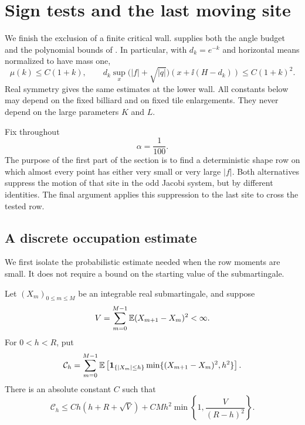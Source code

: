 \section{Sign tests and the last moving site}
\label{sign:section}

We finish the exclusion of a finite critical wall.
 supplies both the angle budget and
the polynomial bounds of .
In particular, with
\(d_k=e^{-k}\) and horizontal means normalized to have mass one,
\begin{equation}\label{sign:polynomial-input}
 \mu(k)\le C(1+k),\qquad
 d_k\sup_x\bigl(|f|+\sqrt{|q|}\bigr)
       (x+\ii(H-d_k))\le C(1+k)^2.
\end{equation}
Real symmetry gives the same estimates at the lower wall.  All constants
below may depend on the fixed billiard and on fixed tile enlargements.
They never depend on the large parameters \(K\) and \(L\).

Fix throughout
\begin{equation}\label{sign:alpha}
 \alpha=\frac1{100}.
\end{equation}
The purpose of the first part of the section is to find a deterministic
shape row on which almost every point has either very small or very large
\(|f|\).  Both alternatives suppress the motion of that site in the odd
Jacobi system, but by different identities.  The final argument applies
this suppression to the last site to cross the tested row.

\subsection{A discrete occupation estimate}

We first isolate the probabilistic estimate needed when the row moments
are small.  It does not require a bound on the starting value of the
submartingale.

\begin{lemma}\label{lem:discrete-tanaka}
Let \((X_m)_{0\le m\le M}\) be an integrable real submartingale, and suppose
\[
 V=\sum_{m=0}^{M-1}\mathbb E(X_{m+1}-X_m)^2<\infty.
\]
For \(0<h<R\), put
\[
 \mathcal C_h=
 \sum_{m=0}^{M-1}\mathbb E\left[
 \mathbf 1_{\{|X_m|\le h\}}
 \min\{(X_{m+1}-X_m)^2,h^2\}\right].
\]
There is an absolute constant \(C\) such that
\begin{equation}\label{sign:tanaka-bound}
 \mathcal C_h\le
 C h(h+R+\sqrt V)
 +C M h^2\min\left\{1,\frac{V}{(R-h)^2}\right\}.
\end{equation}
\end{lemma}

